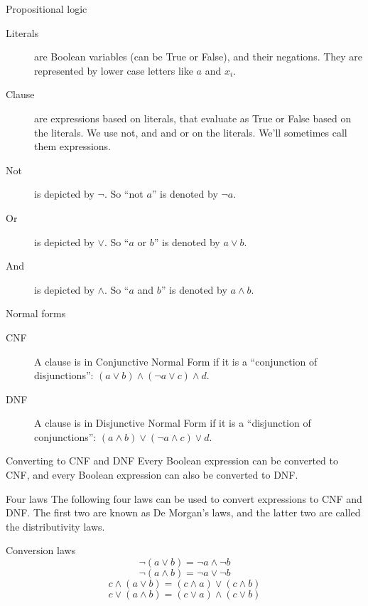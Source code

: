 \begin{frame}{Propositional logic}
  \begin{description}
    \item[Literals] are Boolean variables (can be True or False), and their negations. They are represented by lower case letters like $a$ and $x_i$.
    \vspace{0.3cm}
    \item[Clause] are expressions based on literals, that evaluate as True or False based on the literals. We use not, and and or on the literals. We'll sometimes call them expressions.
    \vspace{0.3cm}
    \item[Not] is depicted by $\neg$. So ``not $a$'' is denoted by $\neg a$.
    \vspace{0.3cm}
    \item[Or] is depicted by $\lor$. So ``$a$ or $b$'' is denoted by $a \lor b$.
    \vspace{0.3cm}
    \item[And] is depicted by $\land$. So ``$a$ and $b$'' is denoted by $a \land b$.
  \end{description}
\end{frame}


\begin{frame}{Normal forms}
  \begin{description}
    \item[CNF] A clause is in Conjunctive Normal Form if it is a ``conjunction of disjunctions'': $(a \lor b) \land (\neg a \lor c) \land d$.
    \vspace{0.5cm}
    \item[DNF] A clause is in Disjunctive Normal Form if it is a ``disjunction of conjunctions'': $(a \land b) \lor (\neg a \land c) \lor d$.
  \end{description}
  
  \vspace{4mm}
  \begin{alertblock}{Converting to CNF and DNF}
    Every Boolean expression can be converted to CNF, and every Boolean expression can also be converted to DNF.
  \end{alertblock}
\end{frame}


\begin{frame}{Four laws}
  The following four laws can be used to convert expressions to CNF and DNF.
  The first two are known as De Morgan's laws, and the latter two are called the distributivity laws.
  \vspace{4mm}
  \begin{alertblock}{Conversion laws}
    \[ \neg ( a \lor b) = \neg a \land \neg b \]
    \[ \neg ( a \land b) = \neg a \lor \neg b \]
    \[ c \land ( a \lor b) = (c \land a) \lor (c \land b) \]
    \[ c \lor ( a \land b) = (c \lor a) \land (c \lor b) \]
  \end{alertblock}
\end{frame}


